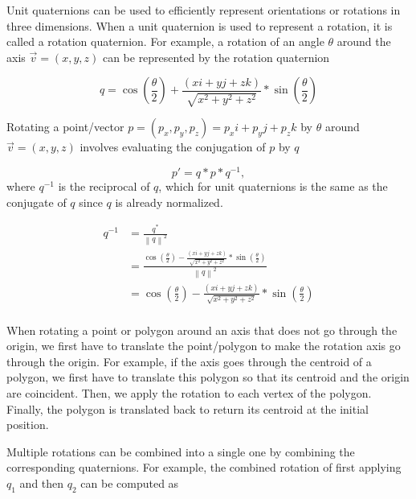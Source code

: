 Unit quaternions can be used to efficiently represent orientations or rotations in three dimensions. When a unit quaternion is used to represent a rotation, it is called a rotation quaternion. For example, a rotation of an angle \( \theta \) around the axis \( \vec{v} = (x, y, z) \) can be represented by the rotation quaternion

\begin{equation}
    q = \cos(\frac{\theta}{2}) + \frac{(xi + yj + zk)}{\sqrt{x^2 + y^2 + z^2}}*\sin(\frac{\theta}{2})
\end{equation}

Rotating a point/vector \( p = (p_x, p_y, p_z) = p_xi + p_yj + p_zk \) by \( \theta \) around \( \vec{v} = (x, y, z) \) involves evaluating the conjugation of \( p \) by \( q \) 

\begin{equation}
    p' = q*p*q^{-1}, 
\end{equation}
where \( q^{-1} \) is the reciprocal of \( q \), which for unit quaternions is the same as the conjugate of \( q \) since \( q \) is already normalized.

\begin{equation}
\begin{split}
    q^{-1} & = \frac{q^{\ast}}{{\left \| q \right \|}^2} \\
            & = \frac{\cos(\frac{\theta}{2}) - \frac{(xi + yj + zk)}{\sqrt{x^2 + y^2 + z^2}}*\sin(\frac{\theta}{2})}{{\left \| q \right \|}^2} \\
            & = \cos(\frac{\theta}{2}) - \frac{(xi + yj + zk)}{\sqrt{x^2 + y^2 + z^2}}*\sin(\frac{\theta}{2}) \\
\end{split}
\end{equation}

When rotating a point or polygon around an axis that does not go through the origin, we first have to translate the point/polygon to make the rotation axis go through the origin. For example, if the axis goes through the centroid of a polygon, we first have to translate this polygon so that its centroid and the origin are coincident. Then, we apply the rotation to each vertex of the polygon. Finally, the polygon is translated back to return its centroid at the initial position.

Multiple rotations can be combined into a single one by combining the corresponding quaternions. For example, the combined rotation of first applying \( q_1 \) and then \( q_2 \) can be computed as 

